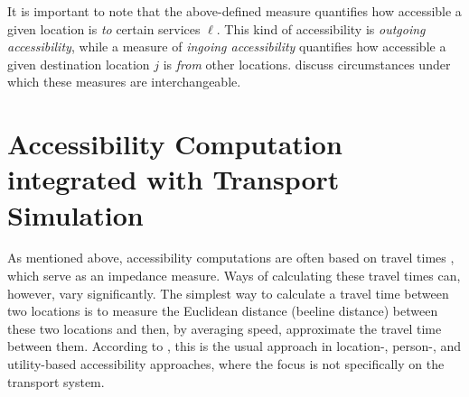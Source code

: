 
It is important to note that the above-defined measure quantifies how accessible a given location is \emph{to} certain
services $\ell$. This kind of accessibility is \emph{outgoing accessibility},
while a measure of \emph{ingoing accessibility} quantifies how accessible a given
destination location $j$ is \emph{from} other locations. \citet{NicolaiNagelHiResAccessibilityMethod} 
discuss circumstances under which these measures are interchangeable.

\section{Accessibility Computation integrated with Transport Simulation}
\label{sec:integrated}
As mentioned above, accessibility computations are often based on travel times 
\citep{BBSRErreichbarkeitsmodell, BuettnerEtAl2010Erreichbarkeitsatlas}, which serve as an impedance measure.
Ways of calculating these travel times can, however, vary significantly. 
The simplest way to calculate a travel time between two locations is to measure the Euclidean distance 
(beeline distance) between these two locations and then, by averaging speed, approximate the 
travel time between them. According to \citet{Geurs2004AccessibilityReview}, this is the usual 
approach in location-, person-, and utility-based accessibility approaches, where the focus 
is not specifically on the transport system.


